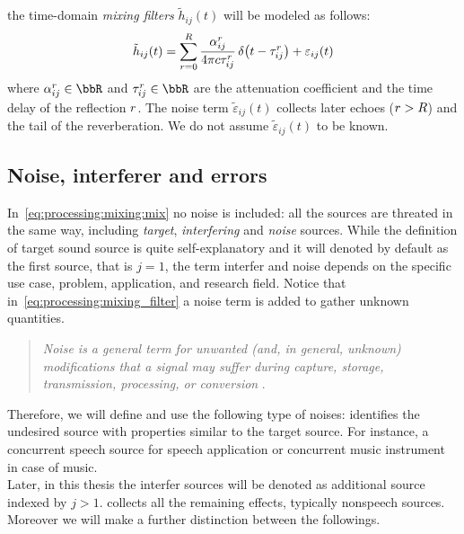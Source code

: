 the time-domain \emph{mixing filters} $\tilde{h}_{ij}( t)$ will be modeled as follows:
\begin{equation}\label{eq:processing:mixing_filter}
    \tilde{h}_{ij}( t) = \sum_{\idxEch=0}^{\numEchs} \frac{\absCoeff_{ij}^r}{4 \pi \speedOfSound \tau_{ij}^r}
                          \diracOf{t - \tau_{ij}^r} + \varepsilon_{ij}(t)
\end{equation}
where $\absCoeff_{ij}^r \in \R$ and $\tau_{ij}^r \in \R$ are the attenuation coefficient and the time delay of the reflection $r$.
The noise term $\tilde{\varepsilon}_{ij}( t)$ collects later echoes ($r > R$) and the tail of the reverberation.
We do not assume $\tilde{\varepsilon}_{ij}( t)$ to be known.

\subsection{Noise, interferer and errors}
In~\cref{eq:processing:mixing:mix} no noise is included:
all the sources are threated in the same way, including \textit{target}, \textit{interfering} and \textit{noise} sources.
While the definition of target sound source is quite self-explanatory and it will denoted by default as the first source, that is $j = 1$,
the term interfer and noise depends on the specific use case, problem, application, and research field.
Notice that in~\cref{eq:processing:mixing_filter} a noise term is added to gather unknown quantities.
\begin{quote}
    \textit{Noise is a general term for unwanted (and, in general, unknown) modifications that a signal may suffer during capture, storage, transmission, processing, or conversion}
    .
\end{quote}
Therefore, we will define and use the following type of noises:
 identifies the undesired source with properties similar to the target source.
For instance, a concurrent speech source for speech application or concurrent music instrument in case of music.
\\Later, in this thesis the interfer sources will be denoted as additional source indexed by $j > 1$.
 collects all the remaining effects, typically nonspeech sources. Moreover we will make a further distinction between the followings.

